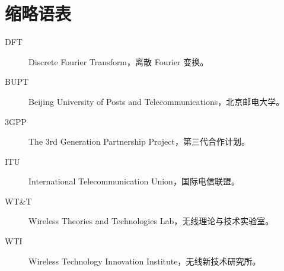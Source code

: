 \chapter{缩略语表}

\begin{description}
  \item[DFT] Discrete Fourier Transform，离散 Fourier 变换。
  \item[BUPT] Beijing University of Posts and Telecommunications，北京邮电大学。
  \item[3GPP] The 3rd Generation Partnership Project，第三代合作计划。
  \item[ITU] International Telecommunication Union，国际电信联盟。
  \item[WT\&T] Wireless Theories and Technologies Lab，无线理论与技术实验室。
  \item[WTI] Wireless Technology Innovation Institute，无线新技术研究所。
\end{description}